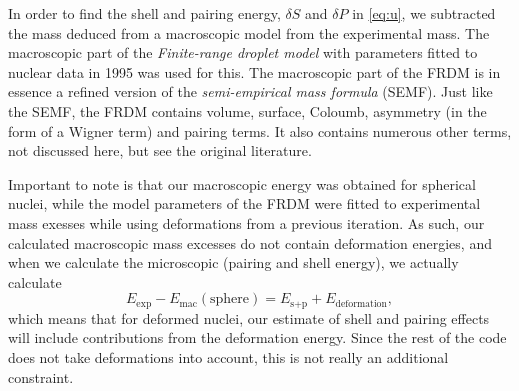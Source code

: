 In order to find the shell and pairing energy, $\delta S$ and $\delta P$ in \eqref{eq:u}, we subtracted the mass deduced from a macroscopic model from the experimental mass.
The macroscopic part of the \emph{Finite-range droplet model} with parameters fitted to nuclear data in 1995\cite{moller1995} was used for this. The macroscopic part of the FRDM is in essence a refined version of the \emph{semi-empirical mass formula} (SEMF). Just like the SEMF, the FRDM contains volume, surface, Coloumb, asymmetry (in the form of a Wigner term) and pairing terms. It also contains numerous other terms, not discussed here, but see the original literature\cite{moller1995}.

Important to note is that our macroscopic energy was obtained for spherical nuclei, while the model parameters of the FRDM were fitted to experimental mass exesses while using deformations from a previous iteration. As such, our calculated macroscopic mass excesses do not contain deformation energies, and when we calculate the microscopic (pairing and shell energy), we actually calculate
\begin{equation}
E_\text{exp} - E_\text{mac}(\text{sphere}) = E_{\text{s}+\text{p}} + E_\text{deformation},
\end{equation}
which means that for deformed nuclei, our estimate of shell and pairing effects will include contributions from the deformation energy.
Since the rest of the code does not take deformations into account, this is not really an additional constraint.%

